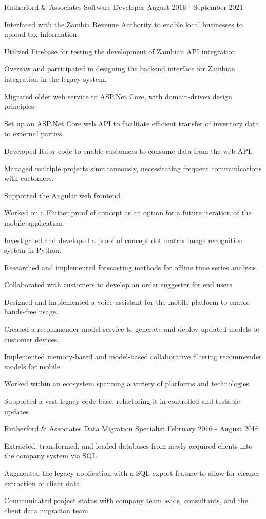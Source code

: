 \documentclass{marvinkassabian_resume}
\begin{document}
\subsectionpositiondate
{Rutherford \& Associates}
{Software Developer}
{August 2016 - September 2021}
\resumesublistbegin
\item Interfaced with the Zambia Revenue Authority to enable local businesses to upload tax information.
\item Utilized Firebase for testing the development of Zambian API integration.
\item Oversaw and participated in designing the backend interface for Zambian integration in the legacy system.
\item Migrated older web service to ASP.Net Core, with domain-driven design principles.
\item Set up an ASP.Net Core web API to facilitate efficient transfer of inventory data to external parties.
\item Developed Ruby code to enable customers to consume data from the web API.
\item Managed multiple projects simultaneously, necessitating frequent communications with customers.
\item Supported the Angular web frontend.
\item Worked on a Flutter proof of concept as an option for a future iteration of the mobile application.
\item Investigated and developed a proof of concept dot matrix image recognition system in Python.
\item Researched and implemented forecasting methods for offline time series analysis.
\item Collaborated with customers to develop an order suggester for end users.
\item Designed and implemented a voice assistant for the mobile platform to enable hands-free usage.
\item Created a recommender model service to generate and deploy updated models to customer devices.
\item Implemented memory-based and model-based collaborative filtering recommender models for mobile.
\item Worked within an ecosystem spanning a variety of platforms and technologies.
\item Supported a vast legacy code base, refactoring it in controlled and testable updates.
\resumesublistend

\subsectionpositiondate
{Rutherford \& Associates}
{Data Migration Specialist}
{February 2016 - August 2016}
\resumesublistbegin
\item Extracted, transformed, and loaded databases from newly acquired clients into the company system via SQL.
\item Augmented the legacy \cpp application with a SQL export feature to allow for cleaner extraction of client data.
\item Communicated project status with company team leads, consultants, and the client data migration team.
\resumesublistend
\end{document}
